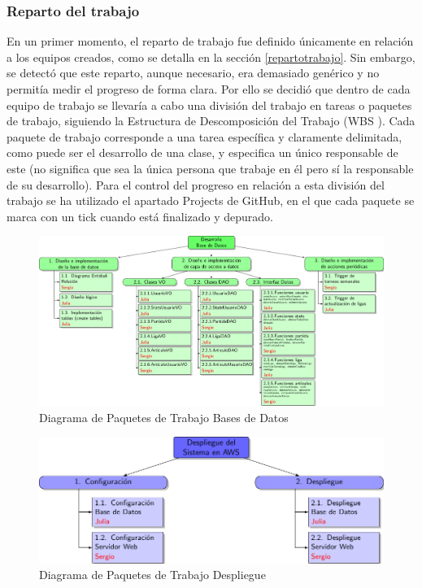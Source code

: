 \subsubsection{Reparto del trabajo}
En un primer momento, el reparto de trabajo fue definido únicamente en relación a los equipos creados, como se detalla en la sección \ref{repartotrabajo}. Sin embargo, se detectó que este reparto, aunque necesario, era demasiado genérico y no permitía medir el progreso de forma clara. Por ello se decidió que dentro de cada equipo de trabajo se llevaría a cabo una división del trabajo en tareas o paquetes de trabajo, siguiendo la Estructura de Descomposición del Trabajo (WBS \cite{edt}). Cada paquete de trabajo corresponde a una tarea específica y claramente delimitada, como puede ser el desarrollo de una clase, y especifica un único responsable de este (no significa que sea la única persona que trabaje en él pero sí la responsable de su desarrollo). Para el control del progreso en relación a esta división del trabajo se ha utilizado el apartado Projects de GitHub, en el que cada paquete se marca con un tick cuando está finalizado y depurado.
\begin{figure}[H]
		\hspace{-2cm}
		\includegraphics[scale=0.8]{figuras/edtBasesDatos.pdf}
		\caption{Diagrama de Paquetes de Trabajo Bases de Datos}
	\end{figure}

\begin{figure}[H]
		\centering
		\includegraphics[scale=0.8]{figuras/edtDespliegue.pdf}
		\caption{Diagrama de Paquetes de Trabajo Despliegue}
	\end{figure}

